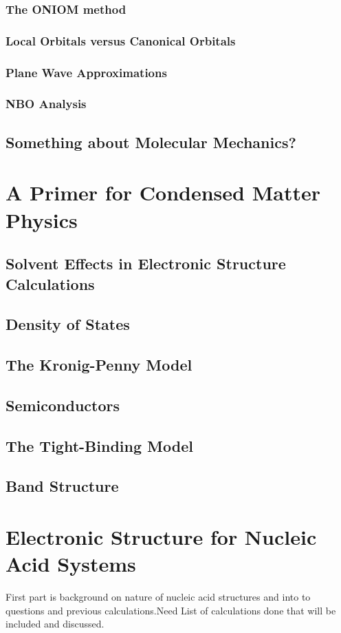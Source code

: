 \documentclass[oneside,12pt]{book}
\begin{document}
\subsection{The ONIOM method}
\subsection{Local Orbitals versus Canonical Orbitals}
\subsection{Plane Wave Approximations}
\subsection{NBO Analysis}
\section{Something about Molecular Mechanics?}

\chapter{A Primer for Condensed Matter Physics}
\section{Solvent Effects in Electronic Structure Calculations}
\section{Density of States}
\section{The Kronig-Penny Model}
\section{Semiconductors}
\section{The Tight-Binding Model}
\section{Band Structure}

\chapter{Electronic Structure for Nucleic Acid Systems}
First part is background on nature of nucleic acid structures and into
to questions and previous calculations.Need List of calculations done
that will be included and discussed.
\end{document}
